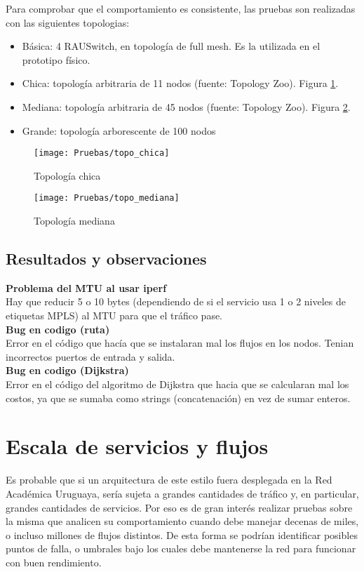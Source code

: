 Para comprobar que el comportamiento es consistente, las pruebas son realizadas con las siguientes topologias:
\begin{itemize}
	\item Básica: 4 RAUSwitch, en topología de full mesh. Es la utilizada en el prototipo físico.
	\item Chica: topología arbitraria de 11 nodos (fuente: Topology Zoo). Figura \ref{fig:topo_chica}.
	\item Mediana: topología arbitraria de 45 nodos (fuente: Topology Zoo). Figura \ref{fig:topo_mediana}.
	\item Grande: topología arborescente de 100 nodos
\end{itemize}

\begin{figure}[t]
\caption{Topología chica}
\texttt{[image: Pruebas/topo\_chica]}
\centering
\label{fig:topo_chica}
\end{figure}

\begin{figure}[t]
\caption{Topología mediana}
\texttt{[image: Pruebas/topo\_mediana]}
\centering
\label{fig:topo_mediana}
\end{figure}

\subsection{Resultados y observaciones}
\textbf{Problema del MTU al usar iperf} \\
Hay que reducir 5 o 10 bytes (dependiendo de si el servicio usa 1 o 2 niveles de etiquetas MPLS) al MTU para que el tráfico pase.\\
\textbf{Bug en codigo (ruta)} \\
Error en el código que hacía que se instalaran mal los flujos en los nodos. Tenian incorrectos puertos de entrada y salida.\\
\textbf{Bug en codigo (Dijkstra)} \\
Error en el código del algoritmo de Dijkstra que hacia que se calcularan mal los costos, ya que se sumaba como strings (concatenación) en vez de sumar enteros.

\section{Escala de servicios y flujos}
Es probable que si un arquitectura de este estilo fuera desplegada en la Red Académica Uruguaya, sería sujeta a grandes cantidades de tráfico y, en particular, grandes cantidades de servicios. Por eso es de gran interés realizar pruebas sobre la misma que analicen su comportamiento cuando debe manejar decenas de miles, o incluso millones de flujos distintos. De esta forma se podrían identificar posibles puntos de falla, o umbrales bajo los cuales debe mantenerse la red para funcionar con buen rendimiento.

